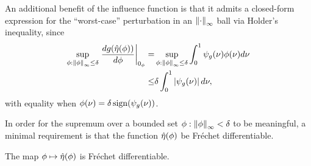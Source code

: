 An additional benefit of the influence function is that it admits a closed-form
expression for the ``worst-case'' perturbation in an $\left\Vert\cdot\right\Vert_{\infty}$ ball
via Holder's inequality, since
%
\begin{align*}
%
\sup_{\phi: \norminf{\phi} \le \delta}
    \fracat{d g(\etaopt(\phi))}{d \phi}{\phiz} =&{}
\sup_{\phi: \norminf{\phi} \le \delta}
    \int_0^1 \inflg(\nu) \phi(\nu) d\nu \\
\le&{} \delta \int_0^1 \abs{\inflg(\nu) }d\nu,
%
\end{align*}
%
with equality when $\phi(\nu) = \delta \, \mathrm{sign}(\psi_{g}(\nu))$.

In order for the supremum over a bounded set $\phi: \left\Vert\phi\right\Vert_{\infty} < \delta$
to be meaningful, a minimal requirement is that the function $\hat\eta(\phi)$
be Fr{\'e}chet differentiable.

\begin{thm}
%
The map $\phi \mapsto \hat\eta(\phi)$ is Fr{\'e}chet differentiable.
%
\end{thm}
